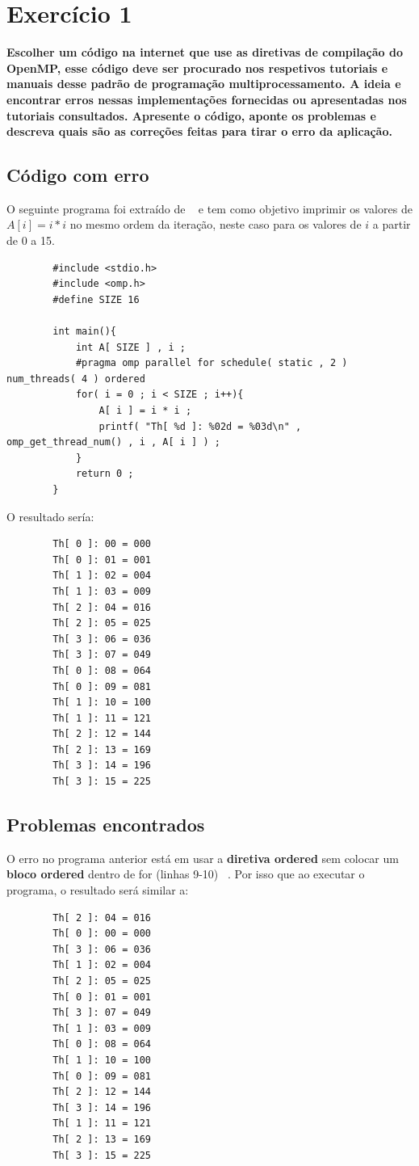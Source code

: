 \documentclass[a4paper,12pt,fleqn]{article}
\begin{document}
\section{Exercício 1} 
\textbf{Escolher um código na internet que use as diretivas de compilação do OpenMP, esse código deve ser procurado nos respetivos tutoriais e manuais desse padrão de programação multiprocessamento. A ideia e encontrar erros nessas implementações fornecidas ou apresentadas nos tutoriais consultados. Apresente o código, aponte os problemas e descreva quais são as correções feitas para tirar o erro da aplicação.} 
 
\subsection{Código com erro} 
	O seguinte programa foi extraído de ~\cite{Rogerio15} e tem como objetivo imprimir os valores de $A[ i ] = i * i$ no mesmo ordem da iteração, neste caso para os valores de $i$ a partir de 0 a 15.

	\begin{lstlisting} 
		#include <stdio.h>
		#include <omp.h>
		#define SIZE 16

		int main(){
			int A[ SIZE ] , i ;
			#pragma omp parallel for schedule( static , 2 ) num_threads( 4 ) ordered
			for( i = 0 ; i < SIZE ; i++){
				A[ i ] = i * i ;
				printf( "Th[ %d ]: %02d = %03d\n" , omp_get_thread_num() , i , A[ i ] ) ;
			}
			return 0 ;
		}
	\end{lstlisting}
	
	O resultado sería:
	\begin{verbatim}
		Th[ 0 ]: 00 = 000
		Th[ 0 ]: 01 = 001
		Th[ 1 ]: 02 = 004
		Th[ 1 ]: 03 = 009
		Th[ 2 ]: 04 = 016
		Th[ 2 ]: 05 = 025
		Th[ 3 ]: 06 = 036
		Th[ 3 ]: 07 = 049
		Th[ 0 ]: 08 = 064
		Th[ 0 ]: 09 = 081
		Th[ 1 ]: 10 = 100
		Th[ 1 ]: 11 = 121
		Th[ 2 ]: 12 = 144
		Th[ 2 ]: 13 = 169
		Th[ 3 ]: 14 = 196
		Th[ 3 ]: 15 = 225
	\end{verbatim}
 
 \subsection{Problemas encontrados} 
 	O erro no programa anterior está em usar a \textbf{diretiva  ordered} sem colocar um \textbf{bloco ordered} dentro de for (linhas 9-10) ~\cite{Lawrence14}. Por isso que ao executar o programa, o resultado será similar a:
	\begin{verbatim} 
		Th[ 2 ]: 04 = 016
		Th[ 0 ]: 00 = 000
		Th[ 3 ]: 06 = 036
		Th[ 1 ]: 02 = 004
		Th[ 2 ]: 05 = 025
		Th[ 0 ]: 01 = 001
		Th[ 3 ]: 07 = 049
		Th[ 1 ]: 03 = 009
		Th[ 0 ]: 08 = 064
		Th[ 1 ]: 10 = 100
		Th[ 0 ]: 09 = 081
		Th[ 2 ]: 12 = 144
		Th[ 3 ]: 14 = 196
		Th[ 1 ]: 11 = 121
		Th[ 2 ]: 13 = 169
		Th[ 3 ]: 15 = 225
	\end{verbatim}
\end{document}
